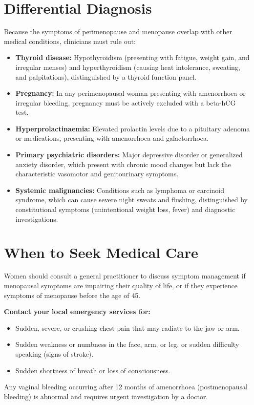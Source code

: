 \section*{Differential Diagnosis}
Because the symptoms of perimenopause and menopause overlap with other medical conditions, clinicians must rule out:
\begin{itemize}
    \item \textbf{Thyroid disease:} Hypothyroidism (presenting with fatigue, weight gain, and irregular menses) and hyperthyroidism (causing heat intolerance, sweating, and palpitations), distinguished by a thyroid function panel.
    \item \textbf{Pregnancy:} In any perimenopausal woman presenting with amenorrhoea or irregular bleeding, pregnancy must be actively excluded with a beta-hCG test.
    \item \textbf{Hyperprolactinaemia:} Elevated prolactin levels due to a pituitary adenoma or medications, presenting with amenorrhoea and galactorrhoea.
    \item \textbf{Primary psychiatric disorders:} Major depressive disorder or generalized anxiety disorder, which present with chronic mood changes but lack the characteristic vasomotor and genitourinary symptoms.
    \item \textbf{Systemic malignancies:} Conditions such as lymphoma or carcinoid syndrome, which can cause severe night sweats and flushing, distinguished by constitutional symptoms (unintentional weight loss, fever) and diagnostic investigations.
\end{itemize}

\section*{When to Seek Medical Care}
Women should consult a general practitioner to discuss symptom management if menopausal symptoms are impairing their quality of life, or if they experience symptoms of menopause before the age of 45.

\textbf{Contact your local emergency services for:}
\begin{itemize}
    \item Sudden, severe, or crushing chest pain that may radiate to the jaw or arm.
    \item Sudden weakness or numbness in the face, arm, or leg, or sudden difficulty speaking (signs of stroke).
    \item Sudden shortness of breath or loss of consciousness.
\end{itemize}
Any vaginal bleeding occurring after 12 months of amenorrhoea (postmenopausal bleeding) is abnormal and requires urgent investigation by a doctor.


